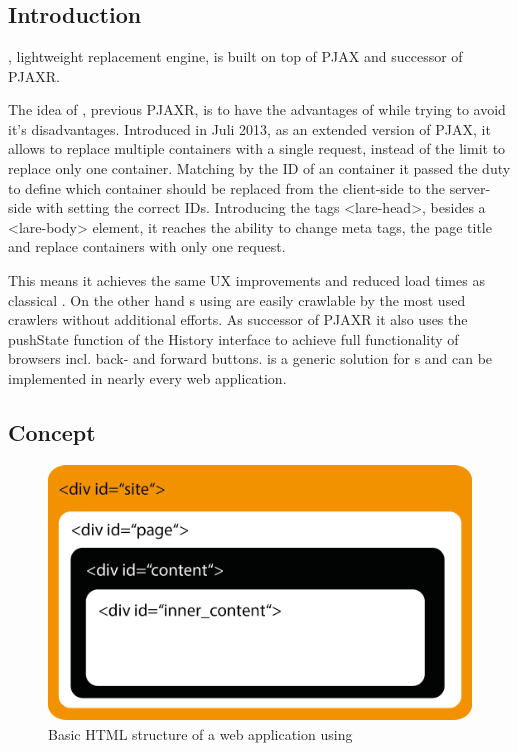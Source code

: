 \section{\lare{}\label{lare}}
\subsection{Introduction}
\lare{}, lightweight \ajax{} replacement engine, is built on top of PJAX and successor of PJAXR.

The idea of \lare{}, previous PJAXR, is to have the advantages of \ajax{} while trying to avoid it's disadvantages.
Introduced in Juli 2013, as an extended version of PJAX, it allows to replace multiple containers with a single request, instead of the limit to replace only one container.
Matching by the ID of an container it passed the duty to define which container should be replaced from the client-side to the server-side with setting the correct IDs.
Introducing the tags <lare-head>, besides a <lare-body> element, it reaches the ability to change meta tags, the page title and replace containers with only one request.

This means it achieves the same UX improvements and reduced load times as classical \ajax{}.
On the other hand \singlePageApplication{}s using \lare{} are easily crawlable by the most used crawlers without additional efforts.
As successor of PJAXR it also uses the pushState function of the History interface to achieve full functionality of browsers incl. back- and forward buttons.
\lare{} is a generic solution for \singlePageApplication{}s and can be implemented in nearly every web application.


\subsection{Concept}

\begin{figure}[H]
\centering
\includegraphics[width=13cm]{images/lare_html.png}
\caption[lare_html]{Basic HTML structure of a web application using \lare{}}
\label{fig:lare_html}
\end{figure}

